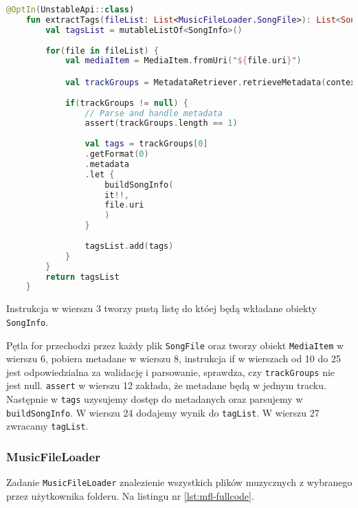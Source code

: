 \begin{lstlisting}[caption=Metoda \texttt{TagExtractor()}, label={lst:Tag-tagextractor}, language=kotlin]
	@OptIn(UnstableApi::class)
	fun extractTags(fileList: List<MusicFileLoader.SongFile>): List<SongInfo> {
		val tagsList = mutableListOf<SongInfo>()
		
		for(file in fileList) {
			val mediaItem = MediaItem.fromUri("${file.uri}")

			val trackGroups = MetadataRetriever.retrieveMetadata(context, mediaItem).get()
			
			if(trackGroups != null) {
				// Parse and handle metadata
				assert(trackGroups.length == 1)
				
				val tags = trackGroups[0]
				.getFormat(0)
				.metadata
				.let {
					buildSongInfo(
					it!!,
					file.uri
					)
				}
				
				tagsList.add(tags)
			}
		}
		return tagsList
	}
\end{lstlisting}
Instrukcja w wierszu 3 tworzy pustą listę do któej będą wkładane obiekty \texttt{SongInfo}.

Pętla for przechodzi przez każdy plik \texttt{SongFile} oraz tworzy obiekt \texttt{MediaItem} w wierszu 6, pobiera metadane w wierszu 8, instrukcja if w wierszach od 10 do 25 jest odpowiedzialna za walidację i parsowanie, sprawdza, czy \texttt{trackGroups} nie jest null. \texttt{assert} w wierszu 12 zakłada, że metadane będą w jednym tracku. Następnie w \texttt{tags} uzysujemy dostęp do metadanych oraz parsujemy w \texttt{buildSongInfo}.
W wierszu 24 dodajemy wynik do \texttt{tagList}.
W wierszu 27 zwracamy \texttt{tagList}.

\subsubsection{MusicFileLoader}
Zadanie \texttt{MusicFileLoader} znalezienie wszystkich plików muzycznych z wybranego przez użytkownika folderu.
Na listingu nr \ref{lst:mfl-fullcode}.

